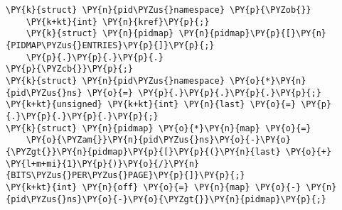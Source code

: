 \begin{Verbatim}[commandchars=\\\{\},codes={\catcode`\$=3\catcode`\^=7\catcode`\_=8}]
\PY{k}{struct} \PY{n}{pid\PYZus{}namespace} \PY{p}{\PYZob{}}
    \PY{k+kt}{int} \PY{n}{kref}\PY{p}{;}
    \PY{k}{struct} \PY{n}{pidmap} \PY{n}{pidmap}\PY{p}{[}\PY{n}{PIDMAP\PYZus{}ENTRIES}\PY{p}{]}\PY{p}{;}
    \PY{p}{.}\PY{p}{.}\PY{p}{.}
\PY{p}{\PYZcb{}}\PY{p}{;}
\PY{k}{struct} \PY{n}{pid\PYZus{}namespace} \PY{o}{*}\PY{n}{pid\PYZus{}ns} \PY{o}{=} \PY{p}{.}\PY{p}{.}\PY{p}{.}\PY{p}{;}
\PY{k+kt}{unsigned} \PY{k+kt}{int} \PY{n}{last} \PY{o}{=} \PY{p}{.}\PY{p}{.}\PY{p}{.}\PY{p}{;}
\PY{k}{struct} \PY{n}{pidmap} \PY{o}{*}\PY{n}{map} \PY{o}{=}
    \PY{o}{\PYZam{}}\PY{n}{pid\PYZus{}ns}\PY{o}{-}\PY{o}{\PYZgt{}}\PY{n}{pidmap}\PY{p}{[}\PY{p}{(}\PY{n}{last} \PY{o}{+} \PY{l+m+mi}{1}\PY{p}{)}\PY{o}{/}\PY{n}{BITS\PYZus{}PER\PYZus{}PAGE}\PY{p}{]}\PY{p}{;}
\PY{k+kt}{int} \PY{n}{off} \PY{o}{=} \PY{n}{map} \PY{o}{-} \PY{n}{pid\PYZus{}ns}\PY{o}{-}\PY{o}{\PYZgt{}}\PY{n}{pidmap}\PY{p}{;}
\end{Verbatim}
